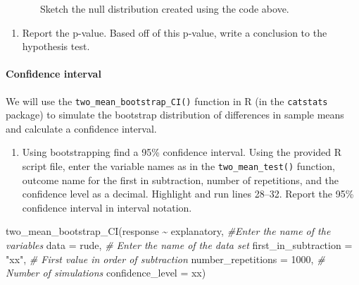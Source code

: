 \documentclass[
]{report}
\newenvironment{Shaded}{\begin{snugshade}}{\end{snugshade}}
\newcommand{\AttributeTok}[1]{\textcolor[rgb]{0.77,0.63,0.00}{#1}}
\newcommand{\CommentTok}[1]{\textcolor[rgb]{0.56,0.35,0.01}{\textit{#1}}}
\newcommand{\DecValTok}[1]{\textcolor[rgb]{0.00,0.00,0.81}{#1}}
\newcommand{\FunctionTok}[1]{\textcolor[rgb]{0.00,0.00,0.00}{#1}}
\newcommand{\NormalTok}[1]{#1}
\newcommand{\SpecialCharTok}[1]{\textcolor[rgb]{0.00,0.00,0.00}{#1}}
\newcommand{\StringTok}[1]{\textcolor[rgb]{0.31,0.60,0.02}{#1}}
\providecommand{\tightlist}{%
  \setlength{\itemsep}{0pt}\setlength{\parskip}{0pt}}
\begin{document}
~~~~~~~Sketch the null distribution created using the code above.

\vspace{1.5in}

\begin{enumerate}
\def\labelenumi{\arabic{enumi}.}
\setcounter{enumi}{16}
\tightlist
\item
  Report the p-value. Based off of this p-value, write a conclusion to the hypothesis test.
\end{enumerate}

\vspace{0.9in}

\newpage

\hypertarget{confidence-interval-2}{%
\paragraph*{Confidence interval}\label{confidence-interval-2}}

We will use the \texttt{two\_mean\_bootstrap\_CI()} function in R (in the \texttt{catstats} package) to simulate the bootstrap distribution of differences in sample means and calculate a confidence interval.

\begin{enumerate}
\def\labelenumi{\arabic{enumi}.}
\setcounter{enumi}{17}
\tightlist
\item
  Using bootstrapping find a 95\% confidence interval. Using the provided R script file, enter the variable names as in the \texttt{two\_mean\_test()} function, outcome name for the first in subtraction, number of repetitions, and the confidence level as a decimal. Highlight and run lines 28--32. Report the 95\% confidence interval in interval notation.
\end{enumerate}

\begin{Shaded}
\begin{Highlighting}[]
\FunctionTok{two\_mean\_bootstrap\_CI}\NormalTok{(response }\SpecialCharTok{\textasciitilde{}}\NormalTok{ explanatory, }\CommentTok{\#Enter the name of the variables}
                      \AttributeTok{data =}\NormalTok{ rude,  }\CommentTok{\# Enter the name of the data set}
                      \AttributeTok{first\_in\_subtraction =} \StringTok{"xx"}\NormalTok{, }\CommentTok{\# First value in order of subtraction}
                      \AttributeTok{number\_repetitions =} \DecValTok{1000}\NormalTok{,  }\CommentTok{\# Number of simulations}
                      \AttributeTok{confidence\_level =}\NormalTok{ xx)}
\end{Highlighting}
\end{Shaded}
\end{document}
